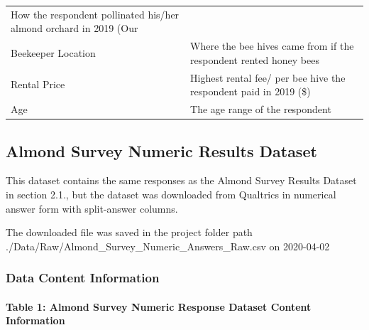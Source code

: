 \documentclass[12pt,]{article}
\let\oldparagraph\paragraph
\renewcommand{\paragraph}[1]{\oldparagraph{#1}\mbox{}}
\begin{document}
\begin{longtable}[]{@{}ll@{}}
\begin{minipage}[t]{0.18\columnwidth}
How the respondent pollinated his/her almond orchard in 2019 (Our\strut
\end{minipage}\tabularnewline
\begin{minipage}[t]{0.38\columnwidth}\raggedright\strut
Beekeeper Location\strut
\end{minipage} & \begin{minipage}[t]{0.18\columnwidth}\raggedright\strut
Where the bee hives came from if the respondent rented honey bees\strut
\end{minipage}\tabularnewline
\begin{minipage}[t]{0.38\columnwidth}\raggedright\strut
Rental Price\strut
\end{minipage} & \begin{minipage}[t]{0.18\columnwidth}\raggedright\strut
Highest rental fee/ per bee hive the respondent paid in 2019 (\$)\strut
\end{minipage}\tabularnewline
\begin{minipage}[t]{0.38\columnwidth}\raggedright\strut
Age\strut
\end{minipage} & \begin{minipage}[t]{0.18\columnwidth}\raggedright\strut
The age range of the respondent\strut
\end{minipage}\tabularnewline
\bottomrule
\end{longtable}

\subsection{Almond Survey Numeric Results
Dataset}\label{almond-survey-numeric-results-dataset}

This dataset contains the same responses as the Almond Survey Results
Dataset in section 2.1., but the dataset was downloaded from Qualtrics
in numerical answer form with split-answer columns.

The downloaded file was saved in the project folder path
./Data/Raw/Almond\_Survey\_Numeric\_Answers\_Raw.csv on 2020-04-02

\subsubsection{Data Content
Information}\label{data-content-information-1}

\paragraph{Table 1: Almond Survey Numeric Response Dataset Content
Information}\label{table-1-almond-survey-numeric-response-dataset-content-information}
\end{document}
